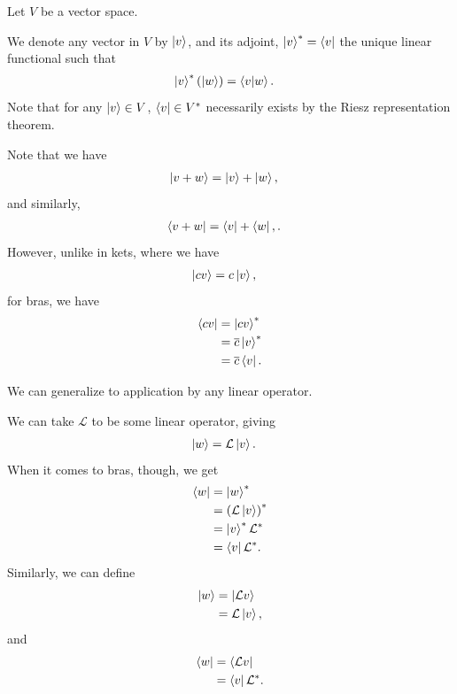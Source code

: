 \documentclass[10pt]{mypackage}
\begin{document}
\begin{definition}
  Let $V$ be a vector space.\newline

  We denote any vector in $V$ by $ \ket{v} $, and its adjoint, $ \ket{v}^{\ast} = \bra{v} $ the unique linear functional such that
  \begin{align*}
    \ket{v}^{\ast}\left(\ket{w}\right) &= \braket{v}{w}.
  \end{align*}
  Note that for any $ \ket{v}\in V $, $ \bra{v}\in V^{\ast} $ necessarily exists by the Riesz representation theorem.
\end{definition}
\begin{example}
Note that we have
\begin{align*}
  \ket{v+w} &= \ket{v} + \ket{w},
\end{align*}
and similarly,
\begin{align*}
  \bra{v+w} &= \bra{v} + \bra{w},.
\end{align*}
However, unlike in kets, where we have
\begin{align*}
  \ket{cv} &=  c \ket{v},
\end{align*}
for bras, we have
\begin{align*}
  \bra{cv} &= \ket{cv}^{\ast}\\
           &= \overline{c} \ket{v}^{\ast}\\
           &= \overline{c} \bra{v}.
\end{align*}
\end{example}
We can generalize to application by any linear operator.
\begin{example}
  We can take $\mathcal{L}$ to be some linear operator, giving
  \begin{align*}
    \ket{w} &= \mathcal{L} \ket{v}.
  \end{align*}
  When it comes to bras, though, we get
  \begin{align*}
    \bra{w} &= \ket{w}^{\ast}\\
            &= \left(\mathcal{L} \ket{v}\right)^{\ast}\\
            &= \ket{v}^{\ast} \mathcal{L}^{\ast}\\
            &= \bra{v} \mathcal{L}^{\ast}.
  \end{align*}
  Similarly, we can define
  \begin{align*}
    \ket{w} &= \ket{\mathcal{L}v}\\
    &= \mathcal{L} \ket{v},
  \end{align*}
  and
  \begin{align*}
    \bra{w} &= \bra{\mathcal{L}v}\\
                   &= \bra{v} \mathcal{L}^{\ast}.
  \end{align*}
\end{example}
\end{document}
